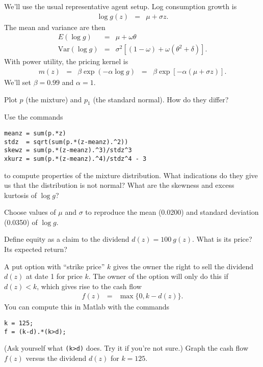 \documentclass[11pt]{exam}
\begin{document}
\begin{questions}
We'll use the usual representative agent setup.
Log consumption growth is
\begin{eqnarray*}
    \log g(z) &=& \mu + \sigma z .
\end{eqnarray*}
The mean and variance are then
\begin{eqnarray*}
    E (\log g) &=& \mu + \omega \theta  \\
    \mbox{Var}(\log g) &=& \sigma^2 [(1-\omega) + \omega (\theta^2 + \delta)] .
\end{eqnarray*}
With power utility, the pricing kernel is
\begin{eqnarray*}
    m(z) &=& \beta \exp(-\alpha \log g)
            \;\;=\;\; \beta \exp[-\alpha (\mu + \sigma z) ] .
\end{eqnarray*}
We'll set $\beta = 0.99$ and $\alpha = 1$.


\begin{parts}
\item Plot $p$ (the mixture) and $p_1$ (the standard normal).
How do they differ?

\item Use the commands
\begin{verbatim}
meanz = sum(p.*z)
stdz  = sqrt(sum(p.*(z-meanz).^2))
skewz = sum(p.*(z-meanz).^3)/stdz^3
xkurz = sum(p.*(z-meanz).^4)/stdz^4 - 3
\end{verbatim}
to compute properties of the mixture distribution.
What indications do they give us that the distribution is not normal?
What are the skewness and excess kurtosis of $\log g$?

\item Choose values of $\mu$ and $\sigma$ to reproduce
the mean (0.0200) and standard deviation (0.0350) of $\log g$.

\item Define equity as a claim to the dividend $d(z) = 100 \ g(z) $.
What is its price?
Its expected return?


\item A put option with  ``strike price'' $k$ gives the owner the right to sell the
dividend $d(z)$ at date 1 for price $k$.
The owner of the option will only do this if $ d(z) < k$,
which gives rise to the cash flow
\begin{eqnarray*}
    f(z) &=& \max \{ 0, k-d(z) \} .
\end{eqnarray*}
You can compute this in Matlab with the commands
\begin{verbatim}
k = 125;
f = (k-d).*(k>d);
\end{verbatim}
(Ask yourself what {\tt (k>d)} does.  Try it if you're not sure.)
Graph the cash flow $f(z)$ versus the dividend $d(z)$ for $k = 125$.



\end{parts}
\end{questions}
\end{document}
